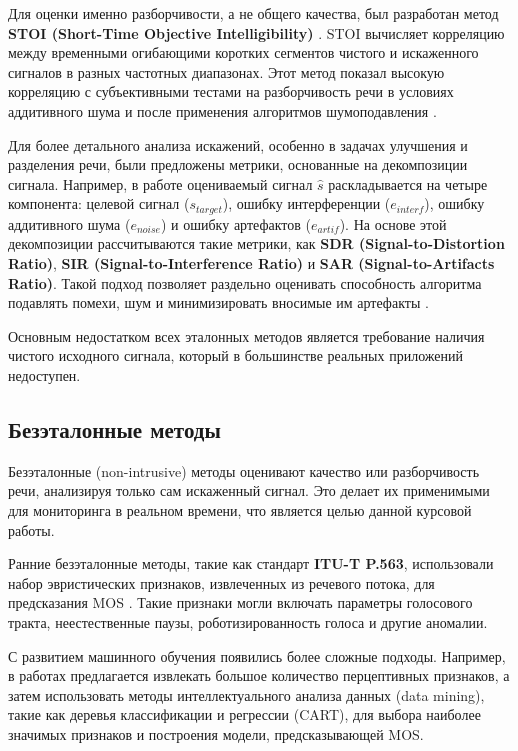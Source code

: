 \documentclass[oneside, final, 14pt]{extarticle}
\begin{document}
Для оценки именно разборчивости, а не общего качества, был разработан метод \textbf{STOI (Short-Time Objective Intelligibility)} \cite{Taal2011}. STOI вычисляет корреляцию между временными огибающими коротких сегментов чистого и искаженного сигналов в разных частотных диапазонах. Этот метод показал высокую корреляцию с субъективными тестами на разборчивость речи в условиях аддитивного шума и после применения алгоритмов шумоподавления \cite{Sharma2016}.

Для более детального анализа искажений, особенно в задачах улучшения и разделения речи, были предложены метрики, основанные на декомпозиции сигнала. Например, в работе \cite{Vincent2006} оцениваемый сигнал $\hat{s}$ раскладывается на четыре компонента: целевой сигнал ($s_{target}$), ошибку интерференции ($e_{interf}$), ошибку аддитивного шума ($e_{noise}$) и ошибку артефактов ($e_{artif}$). На основе этой декомпозиции рассчитываются такие метрики, как \textbf{SDR (Signal-to-Distortion Ratio)}, \textbf{SIR (Signal-to-Interference Ratio)} и \textbf{SAR (Signal-to-Artifacts Ratio)}. Такой подход позволяет раздельно оценивать способность алгоритма подавлять помехи, шум и минимизировать вносимые им артефакты \cite{Vincent2006}.

Основным недостатком всех эталонных методов является требование наличия чистого исходного сигнала, который в большинстве реальных приложений недоступен.

\subsection{Безэталонные методы}

Безэталонные (non-intrusive) методы оценивают качество или разборчивость речи, анализируя только сам искаженный сигнал. Это делает их применимыми для мониторинга в реальном времени, что является целью данной курсовой работы.

Ранние безэталонные методы, такие как стандарт \textbf{ITU-T P.563}, использовали набор эвристических признаков, извлеченных из речевого потока, для предсказания MOS \cite{Sharma2016}. Такие признаки могли включать параметры голосового тракта, неестественные паузы, роботизированность голоса и другие аномалии.

С развитием машинного обучения появились более сложные подходы. Например, в работах \cite{Falk2004, Zha2005} предлагается извлекать большое количество перцептивных признаков, а затем использовать методы интеллектуального анализа данных (data mining), такие как деревья классификации и регрессии (CART), для выбора наиболее значимых признаков и построения модели, предсказывающей MOS.
\end{document}
